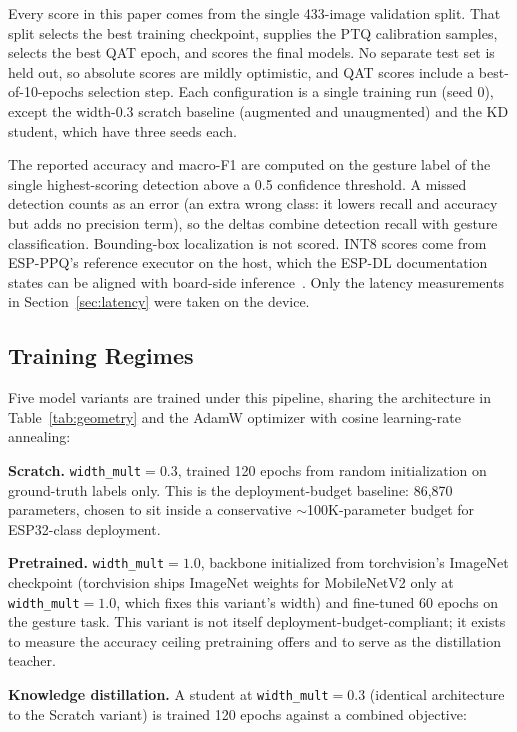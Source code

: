 \documentclass[conference]{IEEEtran}
\begin{document}
	Every score in this paper comes from the single 433-image validation split. That split selects the best training checkpoint, supplies the PTQ calibration samples, selects the best QAT epoch, and scores the final models. No separate test set is held out, so absolute scores are mildly optimistic, and QAT scores include a best-of-10-epochs selection step. Each configuration is a single training run (seed 0), except the width-0.3 scratch baseline (augmented and unaugmented) and the KD student, which have three seeds each.
	
	The reported accuracy and macro-F1 are computed on the gesture label of the single highest-scoring detection above a 0.5 confidence threshold. A missed detection counts as an error (an extra wrong class: it lowers recall and accuracy but adds no precision term), so the deltas combine detection recall with gesture classification. Bounding-box localization is not scored. INT8 scores come from ESP-PPQ's reference executor on the host, which the ESP-DL documentation states can be aligned with board-side inference~\cite{espdldocs}. Only the latency measurements in Section~\ref{sec:latency} were taken on the device.
	
	\subsection{Training Regimes}
	
	Five model variants are trained under this pipeline, sharing the architecture in
	Table~\ref{tab:geometry} and the AdamW optimizer with cosine learning-rate annealing:
	
	\textbf{Scratch.} \texttt{width\_mult}$=0.3$, trained 120 epochs from random initialization on
	ground-truth labels only. This is the deployment-budget baseline: 86{,}870 parameters, chosen
	to sit inside a conservative $\sim$100K-parameter budget for ESP32-class deployment.
	
	\textbf{Pretrained.} \texttt{width\_mult}$=1.0$, backbone initialized from torchvision's
	ImageNet checkpoint (torchvision ships ImageNet weights for MobileNetV2 only at
	\texttt{width\_mult}$=1.0$, which fixes this variant's width) and fine-tuned 60 epochs on the
	gesture task. This variant is not itself deployment-budget-compliant; it exists to measure the
	accuracy ceiling pretraining offers and to serve as the distillation teacher.
	
	\textbf{Knowledge distillation.} A student at \texttt{width\_mult}$=0.3$ (identical
	architecture to the Scratch variant) is trained 120 epochs against a combined objective:
	
\end{document}
